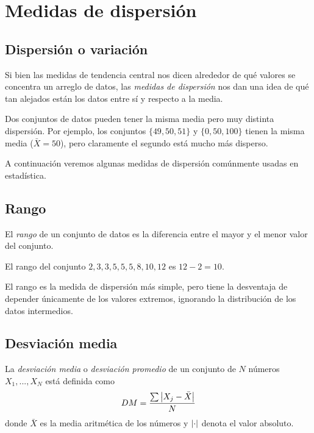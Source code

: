 \section{Medidas de dispersión}

\subsection{Dispersión o variación}
Si bien las medidas de tendencia central nos dicen alrededor de qué valores se concentra un arreglo de datos, las \emph{medidas de dispersión} nos dan una idea de qué tan alejados están los datos entre sí y respecto a la media.

\begin{observacion}
	Dos conjuntos de datos pueden tener la misma media pero muy distinta dispersión. Por ejemplo, los conjuntos $\{49, 50, 51\}$ y $\{0, 50, 100\}$ tienen la misma media ($\bar{X} = 50$), pero claramente el segundo está mucho más disperso.
\end{observacion}

A continuación veremos algunas medidas de dispersión comúnmente usadas en estadística.

\subsection{Rango}
El \emph{rango} de un conjunto de datos es la diferencia entre el mayor y el menor valor del conjunto.

\begin{ejemplo}
	El rango del conjunto $2,3,3,5,5,5,8,10,12$ es $12-2=10.$
\end{ejemplo}

\begin{observacion}
	El rango es la medida de dispersión más simple, pero tiene la desventaja de depender únicamente de los valores extremos, ignorando la distribución de los datos intermedios.
\end{observacion}


\subsection{Desviación media}
La \emph{desviación media} o \emph{desviación promedio} de un conjunto de $N$ números $X_{1},...,X_{N}$ está definida como
\begin{align}
	DM=\dfrac{\sum \left|X_{j}-\bar{X}\right|}{N}
\end{align}
donde $\bar{X}$ es la media aritmética de los números y $\left|\cdot\right|$ denota el valor absoluto.

